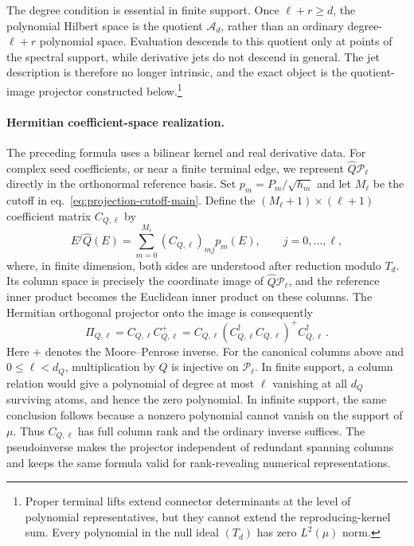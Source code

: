 \documentclass[a4paper,11pt]{article}
\theoremstyle{definition}
\theoremstyle{remark}
\newcommand{\cA}{\mathcal A}
\newcommand{\cP}{\mathcal P}
\newcommand{\Qhat}{\widehat Q}
\begin{document}
The degree condition is essential in finite support.  Once
$\ell+r\ge d$, the polynomial Hilbert space is the quotient
$\cA_d$, rather than an ordinary degree-$\ell+r$ polynomial space.
Evaluation descends to this quotient only at points of the spectral
support, while derivative jets do not descend in general.  The jet
description is therefore no longer intrinsic, and the exact object is
the quotient-image projector constructed below.\footnote{Proper
terminal lifts extend connector determinants at the level of polynomial
representatives, but they cannot extend the reproducing-kernel sum.
Every polynomial in the null ideal $(T_d)$ has zero $L^2(\mu)$ norm.}

\paragraph{Hermitian coefficient-space realization.}
The preceding formula uses a bilinear kernel and real derivative data.
For complex seed coefficients, or near a finite terminal edge, we
represent $\Qhat\cP_\ell$ directly in the orthonormal reference basis.
Set $p_m=P_m/\sqrt{h_m}$ and let
$M_\ell$ be the cutoff in eq.~\eqref{eq:projection-cutoff-main}.  Define
the $(M_\ell+1)\times(\ell+1)$ coefficient matrix $C_{Q,\ell}$ by
\begin{equation}
   E^j\Qhat(E)
   =\sum_{m=0}^{M_\ell}(C_{Q,\ell})_{mj}p_m(E),
   \qquad j=0,\ldots,\ell,
\end{equation}
where, in finite dimension, both sides are understood after reduction
modulo $T_d$.  Its column space is precisely the coordinate image of
$\Qhat\cP_\ell$, and the reference inner product becomes the Euclidean
inner product on these columns.  The Hermitian orthogonal projector onto
the image is consequently
\begin{equation}
   \Pi_{Q,\ell}
   =C_{Q,\ell}C_{Q,\ell}^{+}
   =C_{Q,\ell}
   (C_{Q,\ell}^\dagger C_{Q,\ell})^+
   C_{Q,\ell}^\dagger\,.
   \label{eq:coeff-projector-app}
\end{equation}
Here $+$ denotes the Moore--Penrose inverse.  For the canonical columns
above and $0\le\ell<d_Q$, multiplication by $Q$ is injective on
$\cP_\ell$.  In finite support, a column relation would give a
polynomial of degree at most $\ell$ vanishing at all $d_Q$ surviving
atoms, and hence the zero polynomial.  In infinite support, the same
conclusion follows because a nonzero polynomial cannot vanish on the
support of $\mu$.  Thus $C_{Q,\ell}$ has full column rank and the
ordinary inverse suffices.  The pseudoinverse makes the projector independent of
redundant spanning columns and keeps the same formula valid for
rank-revealing numerical representations.
\end{document}
